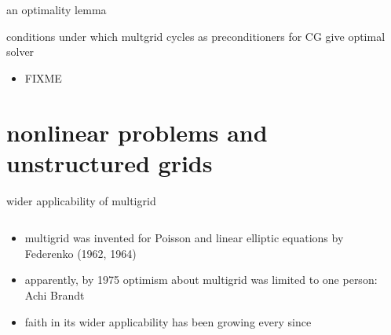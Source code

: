 \documentclass[hide notes,intlimits,usenames,dvipsnames]{beamer}
\begin{document}
\begin{frame}{an optimality lemma}

conditions under which multgrid cycles as preconditioners for CG give optimal solver
\begin{itemize}
\item FIXME
\end{itemize}
\end{frame}


\section{nonlinear problems and unstructured grids}

\begin{frame}{wider applicability of multigrid}

\begin{columns}
\begin{column}{0.8\textwidth}
\begin{itemize}
\item multigrid was invented for Poisson and linear elliptic equations by Federenko (1962, 1964)
\item apparently, by 1975 optimism about multigrid was limited to one person: Achi Brandt
\item faith in its wider applicability has been growing every since
\end{itemize}
\end{column}

\begin{column}{0.15\textwidth}


\end{column}
\end{columns}
\end{frame}
\end{document}
